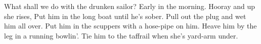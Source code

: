 \beginverse
What shall we do with the drunken sailor? 
\endverse
\beginchorus
Early in the morning.
\endchorus
\beginverse
Hooray and up she rises, 
\endverse
\beginverse
Put him in the long boat until he’s sober. 
\endverse
\beginverse
Pull out the plug and wet him all over. 
\endverse
\beginverse
Put him in the scuppers with a hose-pipe on him. 
\endverse
\beginverse
Heave him by the leg in a running bowlin’. 
\endverse
\beginverse
Tie him to the taffrail when she’s yard-arm under. 
\endverse
\endsong